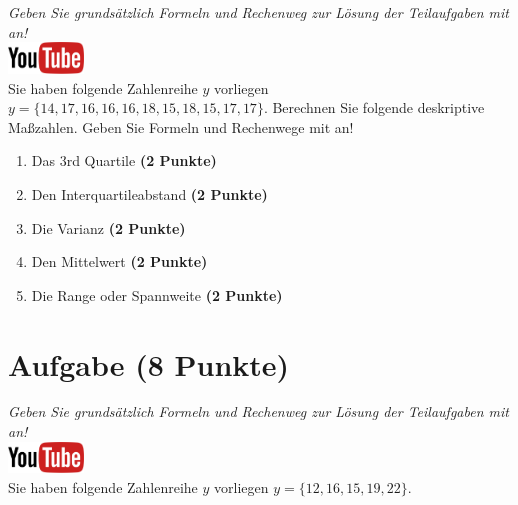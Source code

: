 \documentclass[a4paper, 10pt]{scrartcl}\usepackage[]{graphicx}\usepackage[]{xcolor}
\begin{document}
\textit{Geben Sie grunds{\"a}tzlich Formeln und Rechenweg zur L{\"o}sung der
  Teilaufgaben mit an!} \\[1Ex]

\hfill\href{https://youtu.be/sBlSc_eJbnw}{\includegraphics[width =
  2cm]{img/youtube}}\\[1Ex]


Sie haben folgende Zahlenreihe $y$ vorliegen
$y = \{14, 17, 16, 16, 16, 18, 15, 18, 15, 17, 17\}$. Berechnen Sie folgende
deskriptive Ma{\ss}zahlen. Geben Sie Formeln und Rechenwege mit an!



\begin{enumerate}
\item Das 3rd Quartile \textbf{(2 Punkte)}
\item Den Interquartileabstand \textbf{(2 Punkte)}
\item Die Varianz \textbf{(2 Punkte)}
\item Den Mittelwert \textbf{(2 Punkte)}
\item Die Range oder Spannweite \textbf{(2 Punkte)}
\end{enumerate}
 
\clearpage

\section{Aufgabe \hfill (8 Punkte)}

\textit{Geben Sie grunds{\"a}tzlich Formeln und Rechenweg zur L{\"o}sung der
  Teilaufgaben mit an!} \\[1Ex]

\hfill\href{https://youtu.be/oMdtYbDInYE}{\includegraphics[width =
  2cm]{img/youtube}}\\[1Ex]

Sie haben folgende Zahlenreihe $y$ vorliegen
$y = \{12, 16, 15, 19, 22\}$.
\end{document}
